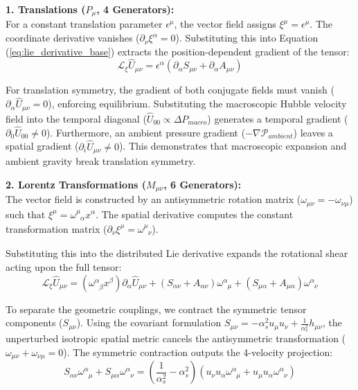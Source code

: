 \textbf{1. Translations ($P_\mu$, 4 Generators):} \\
For a constant translation parameter $\epsilon^\mu$, the vector field assigns $\xi^\mu = \epsilon^\mu$. The coordinate derivative vanishes ($\partial_\nu \xi^\alpha = 0$). Substituting this into Equation (\ref{eq:lie_derivative_base}) extracts the position-dependent gradient of the tensor:
\begin{equation}
    \mathcal{L}_\xi \hat{U}_{\mu\nu} = \epsilon^\alpha (\partial_\alpha S_{\mu\nu} + \partial_\alpha A_{\mu\nu})
\end{equation}

For translation symmetry, the gradient of both conjugate fields must vanish ($\partial_\alpha \hat{U}_{\mu\nu} = 0$), enforcing equilibrium. Substituting the macroscopic Hubble velocity field into the temporal diagonal ($\hat{U}_{00} \propto \Delta P_{macro}$) generates a temporal gradient ($\partial_0 \hat{U}_{00} \neq 0$). Furthermore, an ambient pressure gradient ($-\nabla \mathcal{P}_{ambient}$) leaves a spatial gradient ($\partial_i \hat{U}_{\mu\nu} \neq 0$). This demonstrates that macroscopic expansion and ambient gravity break translation symmetry.
    
\textbf{2. Lorentz Transformations ($M_{\mu\nu}$, 6 Generators):} \\
The vector field is constructed by an antisymmetric rotation matrix ($\omega_{\mu\nu} = -\omega_{\nu\mu}$) such that $\xi^\mu = \omega^\mu_{\phantom{\mu}\alpha} x^\alpha$. The spatial derivative computes the constant transformation matrix ($\partial_\nu \xi^\mu = \omega^\mu_{\phantom{\mu}\nu}$).

Substituting this into the distributed Lie derivative expands the rotational shear acting upon the full tensor:
\begin{equation}
    \mathcal{L}_\xi \hat{U}_{\mu\nu} = (\omega^\alpha_{\phantom{\alpha}\beta} x^\beta) \partial_\alpha \hat{U}_{\mu\nu} + (S_{\alpha\nu} + A_{\alpha\nu}) \omega^\alpha_{\phantom{\alpha}\mu} + (S_{\mu\alpha} + A_{\mu\alpha}) \omega^\alpha_{\phantom{\alpha}\nu}
\end{equation}

To separate the geometric couplings, we contract the symmetric tensor components ($S_{\mu\nu}$). Using the covariant formulation $S_{\mu\nu} = -\alpha_s^2 u_\mu u_\nu + \frac{1}{\alpha_s^2} h_{\mu\nu}$, the unperturbed isotropic spatial metric cancels the antisymmetric transformation ($\omega_{\mu\nu} + \omega_{\nu\mu} = 0$). The symmetric contraction outputs the 4-velocity projection:
\begin{equation}
    S_{\alpha\nu} \omega^\alpha_{\phantom{\alpha}\mu} + S_{\mu\alpha} \omega^\alpha_{\phantom{\alpha}\nu} = \left( \frac{1}{\alpha_s^2} - \alpha_s^2 \right) (u_\nu u_\alpha \omega^\alpha_{\phantom{\alpha}\mu} + u_\mu u_\alpha \omega^\alpha_{\phantom{\alpha}\nu})
\end{equation}


